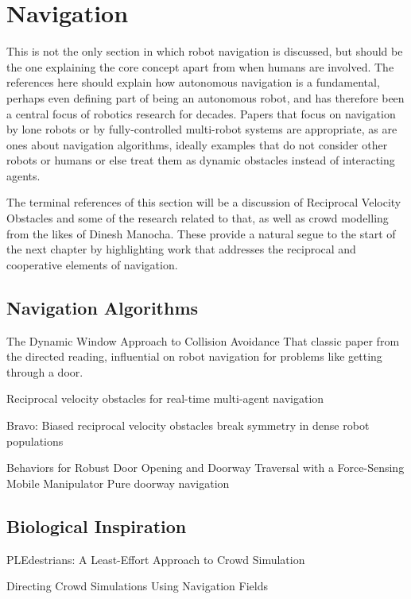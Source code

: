 \documentclass{sfuthesis}
\begin{document}
\section{Navigation}

This is not the only section in which robot navigation is discussed, but should be the one explaining the core concept apart from when humans are involved. The references here should explain how autonomous navigation is a fundamental, perhaps even defining part of being an autonomous robot, and has therefore been a central focus of robotics research for decades. Papers that focus on navigation by lone robots or by fully-controlled multi-robot systems are appropriate, as are ones about navigation algorithms, ideally examples that do not consider other robots or humans or else treat them as dynamic obstacles instead of interacting agents.

The terminal references of this section will be a discussion of Reciprocal Velocity Obstacles and some of the research related to that, as well as crowd modelling from the likes of Dinesh Manocha. These provide a natural segue to the start of the next chapter by highlighting work that addresses the reciprocal and cooperative elements of navigation.



\subsection{Navigation Algorithms}

The Dynamic Window Approach to Collision Avoidance	That classic paper from the directed reading, influential on robot navigation for problems like getting through a door.	

Reciprocal velocity obstacles for real-time multi-agent navigation

Bravo: Biased reciprocal velocity obstacles break symmetry in dense robot populations

Behaviors for Robust Door Opening and Doorway Traversal with a Force-Sensing Mobile Manipulator		Pure doorway navigation

\subsection{Biological Inspiration}

PLEdestrians: A Least-Effort Approach to Crowd Simulation

Directing Crowd Simulations Using Navigation Fields
\end{document}
